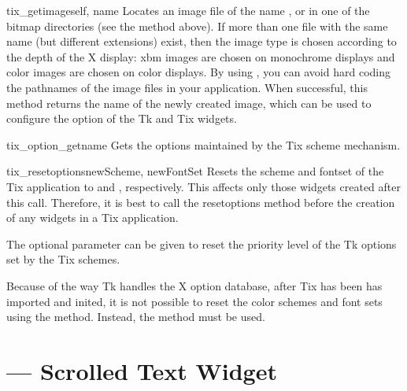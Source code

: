 \begin{methoddesc}{tix_getimage}{self, name}
Locates an image file of the name ,  or
 in one of the bitmap directories (see the
 method above). If more than one file with
the same name (but different extensions) exist, then the image type is
chosen according to the depth of the X display: xbm images are chosen
on monochrome displays and color images are chosen on color
displays. By using , you can avoid hard coding
the pathnames of the image files in your application. When successful,
this method returns the name of the newly created image, which can be
used to configure the  option of the Tk and Tix widgets.
\end{methoddesc}

\begin{methoddesc}{tix_option_get}{name}
Gets the options maintained by the Tix scheme mechanism.
\end{methoddesc}

\begin{methoddesc}{tix_resetoptions}{newScheme, newFontSet}
Resets the scheme and fontset of the Tix application to
 and , respectively.  This affects only
those widgets created after this call.  Therefore, it is best to call
the resetoptions method before the creation of any widgets in a Tix
application.

The optional parameter  can be given to reset the
priority level of the Tk options set by the Tix schemes.

Because of the way Tk handles the X option database, after Tix has
been has imported and inited, it is not possible to reset the color
schemes and font sets using the  method.
Instead, the  method must be used.
\end{methoddesc}



\section{ ---
         Scrolled Text Widget}


